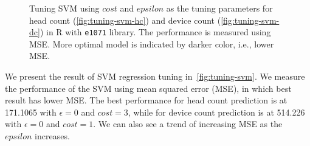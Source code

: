 	\begin{figure}[h]
		\begin{adjustwidth}{-1cm}{}
		\centering
		\end{adjustwidth}
		\caption{Tuning \ac{SVM} using $cost$ and $epsilon$ as the tuning parameters for head count (\ref{fig:tuning-svm-hc}) and device count (\ref{fig:tuning-svm-dc}) in R with \texttt{e1071} library. The performance is measured using \ac{MSE}. More optimal model is indicated by darker color, i.e., lower \ac{MSE}.}
		\label{fig:tuning-svm}
	\end{figure}

	We present the result of \ac{SVM} regression tuning in~\autoref{fig:tuning-svm}. We measure the performance of the \ac{SVM} using mean squared error (\ac{MSE}), in which best result has lower \ac{MSE}. The best performance for head count prediction is at 171.1065 with $\epsilon=0$ and $cost=3$, while for device count prediction is at 514.226 with $\epsilon=0$ and $cost=1$. We can also see a trend of increasing \ac{MSE} as the $epsilon$ increases.

